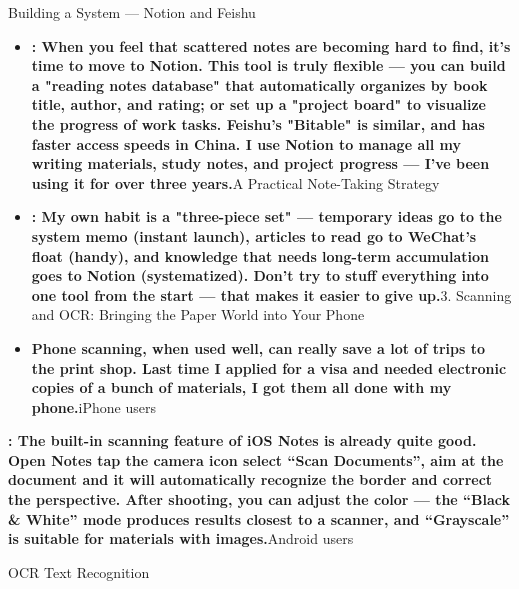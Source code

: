 Building a System — Notion and Feishu

\begin{itemize}
  \item \textbf{: When you feel that scattered notes are becoming hard to find, it's time to move to Notion. This tool is truly flexible — you can build a "reading notes database" that automatically organizes by book title, author, and rating; or set up a "project board" to visualize the progress of work tasks. Feishu's "Bitable" is similar, and has faster access speeds in China. I use Notion to manage all my writing materials, study notes, and project progress — I've been using it for over three years.}A Practical Note-Taking Strategy
  \item \textbf{: My own habit is a "three-piece set" — temporary ideas go to the system memo (instant launch), articles to read go to WeChat's float (handy), and knowledge that needs long-term accumulation goes to Notion (systematized). Don't try to stuff everything into one tool from the start — that makes it easier to give up.}3. Scanning and OCR: Bringing the Paper World into Your Phone
  \item \textbf{Phone scanning, when used well, can really save a lot of trips to the print shop. Last time I applied for a visa and needed electronic copies of a bunch of materials, I got them all done with my phone.}iPhone users
\end{itemize}

\textbf{: The built-in scanning feature of iOS Notes is already quite good. Open Notes tap the camera icon select “Scan Documents”, aim at the document and it will automatically recognize the border and correct the perspective. After shooting, you can adjust the color — the “Black \& White” mode produces results closest to a scanner, and “Grayscale” is suitable for materials with images.}Android users


OCR Text Recognition

